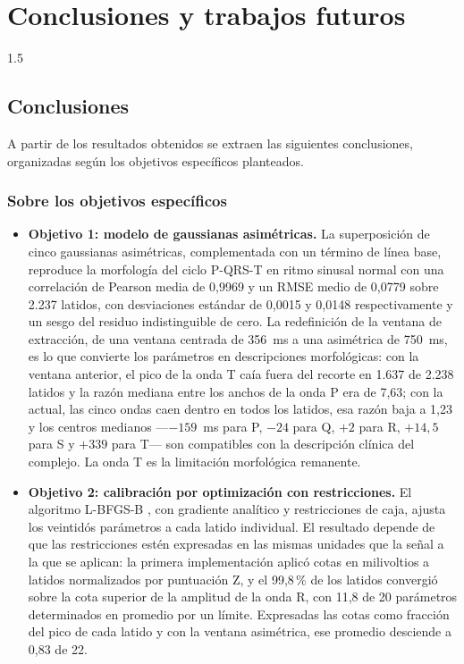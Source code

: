 \section{Conclusiones y trabajos futuros}
\begin{spacing}{1.5}

\subsection{Conclusiones}
\label{sec:conclusiones}

A partir de los resultados obtenidos se extraen las siguientes conclusiones, organizadas según los objetivos específicos planteados.

\subsubsection{Sobre los objetivos específicos}

\begin{itemize}
    \item \textbf{Objetivo 1: modelo de gaussianas asimétricas.} La superposición de cinco gaussianas asimétricas, complementada con un término de línea base, reproduce la morfología del ciclo P-QRS-T en ritmo sinusal normal con una correlación de Pearson media de 0,9969 y un RMSE medio de 0,0779 sobre 2.237 latidos, con desviaciones estándar de 0,0015 y 0,0148 respectivamente y un sesgo del residuo indistinguible de cero. La redefinición de la ventana de extracción, de una ventana centrada de 356~ms a una asimétrica de 750~ms, es lo que convierte los parámetros en descripciones morfológicas: con la ventana anterior, el pico de la onda T caía fuera del recorte en 1.637 de 2.238 latidos y la razón mediana entre los anchos de la onda P era de 7,63; con la actual, las cinco ondas caen dentro en todos los latidos, esa razón baja a 1,23 y los centros medianos ---$-159$~ms para P, $-24$ para Q, $+2$ para R, $+14{,}5$ para S y $+339$ para T--- son compatibles con la descripción clínica del complejo. La onda T es la limitación morfológica remanente.

    \item \textbf{Objetivo 2: calibración por optimización con restricciones.} El algoritmo L-BFGS-B \cite{byrd1995limited}, con gradiente analítico y restricciones de caja, ajusta los veintidós parámetros a cada latido individual. El resultado depende de que las restricciones estén expresadas en las mismas unidades que la señal a la que se aplican: la primera implementación aplicó cotas en milivoltios a latidos normalizados por puntuación Z, y el 99,8\,\% de los latidos convergió sobre la cota superior de la amplitud de la onda R, con 11,8 de 20 parámetros determinados en promedio por un límite. Expresadas las cotas como fracción del pico de cada latido y con la ventana asimétrica, ese promedio desciende a 0,83 de 22.


\end{itemize}
\end{spacing}
